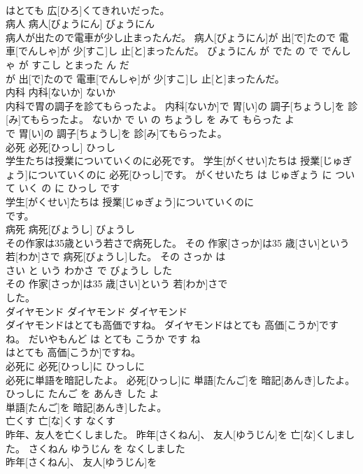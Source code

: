 \documentclass[8pt]{extreport}
\begin{document}
\begin{CJK}{UTF8}{min}
\\	はとても 広[ひろ]くてきれいだった。			
\\	病人	病人[びょうにん]	びょうにん	
\\	病人が出たので電車が少し止まったんだ。	病人[びょうにん]が 出[で]たので 電車[でんしゃ]が 少[すこ]し 止[と]まったんだ。	びょうにん が でた の で でんしゃ が すこし とまった ん だ	
\\	が 出[で]たので 電車[でんしゃ]が 少[すこ]し 止[と]まったんだ。			
\\	内科	内科[ないか]	ないか	
\\	内科で胃の調子を診てもらったよ。	内科[ないか]で 胃[い]の 調子[ちょうし]を 診[み]てもらったよ。	ないか で い の ちょうし を みて もらった よ	
\\	で 胃[い]の 調子[ちょうし]を 診[み]てもらったよ。			
\\	必死	必死[ひっし]	ひっし	
\\	学生たちは授業についていくのに必死です。	学生[がくせい]たちは 授業[じゅぎょう]についていくのに 必死[ひっし]です。	がくせいたち は じゅぎょう に ついて いく の に ひっし です	
\\	学生[がくせい]たちは 授業[じゅぎょう]についていくのに
\\	です。			
\\	病死	病死[びょうし]	びょうし	
\\	その作家は35歳という若さで病死した。	その 作家[さっか]は35 歳[さい]という 若[わか]さで 病死[びょうし]した。	その さっか は 
\\	さい と いう わかさ で びょうし した	
\\	その 作家[さっか]は35 歳[さい]という 若[わか]さで
\\	した。			
\\	ダイヤモンド	ダイヤモンド	ダイヤモンド	
\\	ダイヤモンドはとても高価ですね。	ダイヤモンドはとても 高価[こうか]ですね。	だいやもんど は とても こうか です ね	
\\	はとても 高価[こうか]ですね。			
\\	必死に	必死[ひっし]に	ひっしに	
\\	必死に単語を暗記したよ。	必死[ひっし]に 単語[たんご]を 暗記[あんき]したよ。	ひっしに たんご を あんき した よ	
\\	単語[たんご]を 暗記[あんき]したよ。			
\\	亡くす	亡[な]くす	なくす	
\\	昨年、友人を亡くしました。	昨年[さくねん]、 友人[ゆうじん]を 亡[な]くしました。	さくねん ゆうじん を なくしました	
\\	昨年[さくねん]、 友人[ゆうじん]を

\end{CJK}
\end{document}
